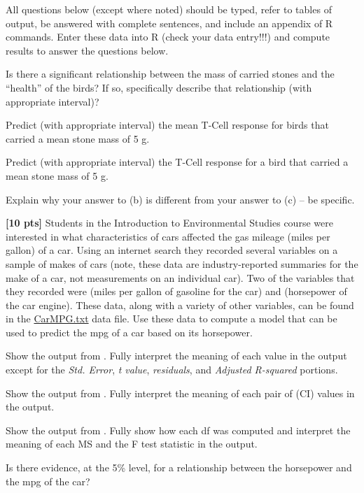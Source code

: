 \documentclass[10pt,openany]{book}\usepackage[]{graphicx}\usepackage[]{color}
\begin{document}
\begin{hwsection}{All questions below (except where noted) should be typed, refer to tables of output, be answered with complete sentences, and include an appendix of R commands.}
  Enter these data into R (check your data entry!!!) and compute results to answer the questions below.
    \begin{Enumerate}
      \item Is there a significant relationship between the mass of carried stones and the ``health'' of the birds?  If so, specifically describe that relationship (with appropriate interval)?
      \item Predict (with appropriate interval) the mean T-Cell response for birds that carried a mean stone mass of 5 g.
      \item Predict (with appropriate interval) the T-Cell response for a bird that carried a mean stone mass of 5 g.
      \item Explain why your answer to (b) is different from your answer to (c) -- be specific.
    \end{Enumerate}

  \item \label{hwprob:LMSLRCarMPG1} \textbf{[10 pts]} Students in the Introduction to Environmental Studies course were interested in what characteristics of cars affected the gas mileage (miles per gallon) of a car.  Using an internet search they recorded several variables on a sample of makes of cars (note, these data are industry-reported summaries for the make of a car, not measurements on an individual car).  Two of the variables that they recorded were  (miles per gallon of gasoline for the car) and  (horsepower of the car engine).  These data, along with a variety of other variables, can be found in the \href{https://sites.google.com/site/ncstats/data/CarMPG.txt}{CarMPG.txt} data file.  Use these data to compute a model that can be used to predict the mpg of a car based on its horsepower.
    \begin{Enumerate}
      \item Show the output from .  Fully interpret the meaning of each value in the output except for the \emph{Std. Error}, \emph{t value}, \emph{residuals}, and \emph{Adjusted R-squared} portions.
      \item Show the output from .  Fully interpret the meaning of each pair of (CI) values in the output.
      \item Show the output from .  Fully show how each df was computed and interpret the meaning of each MS and the F test statistic in the output.
      \item Is there evidence, at the 5\% level, for a relationship between the horsepower and the mpg of the car?
    \end{Enumerate}


\end{hwsection}
\end{document}
